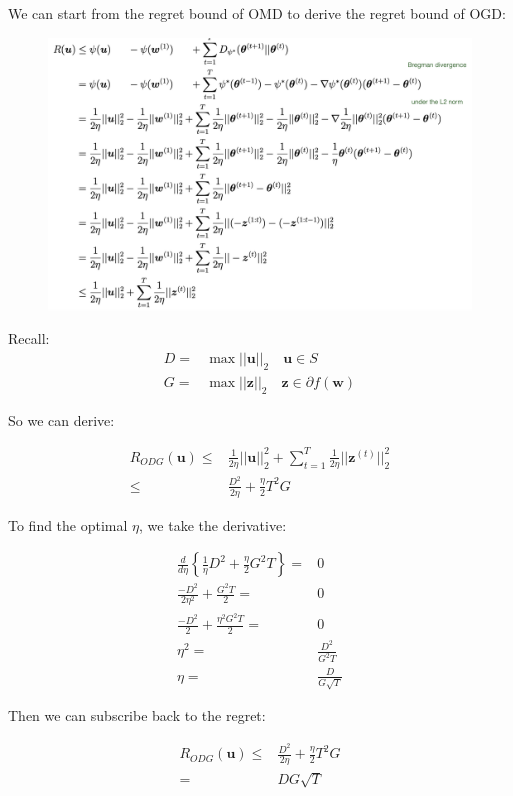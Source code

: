 \documentclass[11pt]{article}
\newcommand{\bz}{\boldsymbol{z}}
\newcommand{\bw}{\boldsymbol{w}}
\newcommand{\bu}{\boldsymbol{u}}
\begin{document}
We can start from the regret bound of OMD to derive the regret bound of OGD:
\begin{figure}[H]
    \centering
    \includegraphics[width=0.9\linewidth]{Img/regret_derive.png}
    \label{fig:OGD_regret_x}
\end{figure}
Recall:
\begin{align}
    D = &\max ||\bu||_2 \quad \bu\in S \nonumber\\
    G = &\max ||\bz||_2 \quad \bz\in \partial f(\bw) \nonumber
\end{align}

So we can derive:

\begin{align}
    R_{ODG} (\bu) \leq & \frac{1}{2 \eta}||\bu||_2^2 + \sum_{t=1}^T \frac{1}{2 \eta} ||\bz^{(t)}||_2^2  \nonumber\\
    \leq & \frac{D^2}{2 \eta} + \frac{\eta}{2} T^2 G \nonumber
\end{align}

To find the optimal $\eta$, we take the derivative:

\begin{align}
    \frac{d}{d \eta} \left\{ \frac{1}{\eta} D^2 + \frac{\eta}{2} G^2T \right\} = & 0  \nonumber\\
    \frac{-D^2}{2 \eta^2} + \frac{G^2 T}{2}= & 0 \nonumber \\
    \frac{-D^2}{2} + \frac{ \eta^2 G^2 T}{2}= & 0 \nonumber \\
    \eta^2 = & \frac{D^2}{G^2 T} \nonumber \\
    \eta =& \frac{D}{G \sqrt{T}} \nonumber
\end{align}

Then we can subscribe back to the regret:

\begin{align}
    R_{ODG} (\bu) \leq & \frac{D^2}{2 \eta} + \frac{\eta}{2} T^2 G \nonumber \\
    = & DG \sqrt{T} \nonumber
\end{align}
\end{document}
